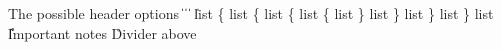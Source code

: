 \documentclass{noted}
\begin{document}
The possible header options \|
 \|
 \|
 \|

list \{
	\> list \{
		\> list \{
			\> list \{
				\> list
			\} \> list
		\} \> list
	\} \> list
\}
list 
\|
\r{Important notes}
\cline
\r{Divider above}
\end{document}
